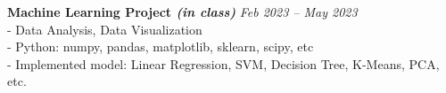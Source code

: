 \documentclass[a4paper,10pt]{article}
\begin{document}
\textbf{Machine Learning Project \textit{(in class)}} \hfill \textit{Feb 2023 -- May 2023}\\
- Data Analysis, Data Visualization\\
- Python: numpy, pandas, matplotlib, sklearn, scipy, etc\\
- Implemented model: Linear Regression, SVM, Decision Tree, K-Means, PCA, etc.\\

\end{document}
